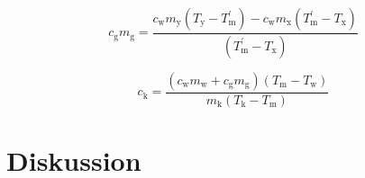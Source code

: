 \documentclass[titlepage = firstcover]{scrartcl}
\begin{document}
            \begin{equation}
                \label{eqn:Wärmekapazität}
                c_\text{g} m_\text{g} = \frac{c_\text{w} m_\text{y}(T_\text{y} - T_\text{m}^{'}) - c_\text{w} m_\text{x}(T_\text{m}^{'} - T_\text{x})}{(T_\text{m}^{'} - T_\text{x})}
            \end{equation}

            \begin{equation}
                \label{eqn:spezWärmekapazität}
                c_\text{k} = \frac{(c_\text{w} m_\text{w} + c_\text{g} m_\text{g})(T_\text{m} - T_\text{w})}{m_\text{k}(T_\text{k} - T_\text{m})}
            \end{equation}
    
    
    \section{Diskussion}

          

        
        
\end{document}
